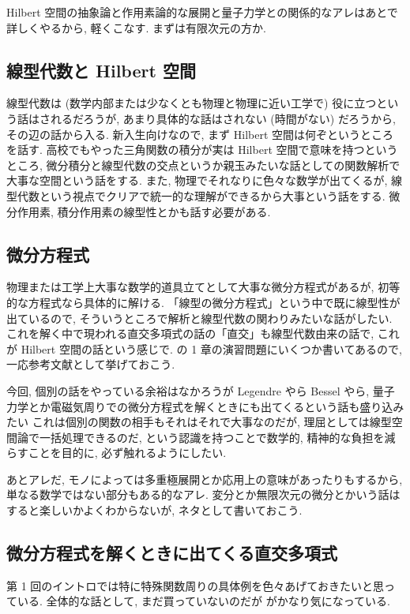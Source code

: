\documentclass[openany, a4paper, oneside]{jsbook}
\theoremstyle{break}
\theoremstyle{breakdefn}
\begin{document}
Hilbert 空間の抽象論と作用素論的な展開と量子力学との関係的なアレはあとで詳しくやるから, 軽くこなす.
まずは有限次元の方か.
\subsection{線型代数と Hilbert 空間}


線型代数は (数学内部または少なくとも物理と物理に近い工学で) 役に立つという話はされるだろうが,
あまり具体的な話はされない (時間がない) だろうから, その辺の話から入る.
新入生向けなので, まず Hilbert 空間は何ぞというところを話す.
高校でもやった三角関数の積分が実は Hilbert 空間で意味を持つというところ,
微分積分と線型代数の交点というか親玉みたいな話としての関数解析で大事な空間という話をする.
また, 物理でそれなりに色々な数学が出てくるが, 線型代数という視点でクリアで統一的な理解ができるから大事という話をする.
微分作用素, 積分作用素の線型性とかも話す必要がある.
\subsection{微分方程式}


物理または工学上大事な数学的道具立てとして大事な微分方程式があるが,
初等的な方程式なら具体的に解ける.
「線型の微分方程式」という中で既に線型性が出ているので, そういうところで解析と線型代数の関わりみたいな話がしたい.
これを解く中で現われる直交多項式の話の「直交」も線型代数由来の話で, これが Hilbert 空間の話という感じで.
\cite{AraiEzawa1} の 1 章の演習問題にいくつか書いてあるので, 一応参考文献として挙げておこう.

今回, 個別の話をやっている余裕はなかろうが Legendre やら Bessel やら,
量子力学とか電磁気周りでの微分方程式を解くときにも出てくるという話も盛り込みたい
これは個別の関数の相手もそれはそれで大事なのだが, 理屈としては線型空間論で一括処理できるのだ,
という認識を持つことで数学的, 精神的な負担を減らすことを目的に, 必ず触れるようにしたい.

あとアレだ, モノによっては多重極展開とか応用上の意味があったりもするから,
単なる数学ではない部分もある的なアレ.
変分とか無限次元の微分とかいう話はすると楽しいかよくわからないが, ネタとして書いておこう.
\subsection{微分方程式を解くときに出てくる直交多項式}


第 1 回のイントロでは特に特殊関数周りの具体例を色々あげておきたいと思っている.
全体的な話として, まだ買っていないのだが \cite{KazuhikoAomoto1} がかなり気になっている.
\end{document}
